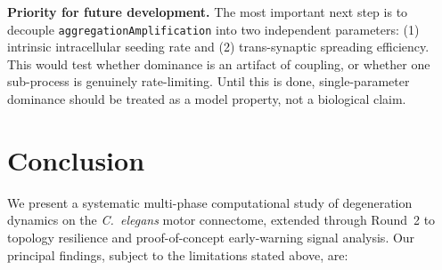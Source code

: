 \documentclass[12pt,a4paper]{article}
\begin{document}
\textbf{Priority for future development.}
The most important next step is to decouple \texttt{aggregationAmplification} into two
independent parameters: (1) intrinsic intracellular seeding rate and (2) trans-synaptic
spreading efficiency. This would test whether dominance is an artifact of coupling, or whether
one sub-process is genuinely rate-limiting. Until this is done, single-parameter dominance
should be treated as a model property, not a biological claim.

\clearpage
\section{Conclusion}

We present a systematic multi-phase computational study of degeneration dynamics on the
\textit{C.~elegans} motor connectome, extended through Round~2 to topology resilience and
proof-of-concept early-warning signal analysis. Our principal findings, subject to the
limitations stated above, are:
\end{document}
